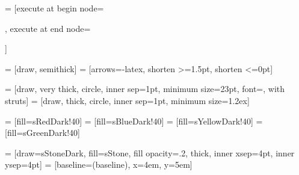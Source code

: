 \usepackage{tikz}
\usetikzlibrary{arrows.meta}
\usetikzlibrary{backgrounds}
\usetikzlibrary{fit}
\usetikzlibrary{scopes}

 = [execute at begin node={\strut}, execute at end node={\strut}]

 = [draw, semithick]
 = [arrows={-latex}, shorten >=1.5pt, shorten <=0pt]

 = [draw, very thick, circle, inner sep=1pt, minimum size=23pt, font=\small, with struts]
 = [draw, thick, circle, inner sep=1pt, minimum size=1.2ex]

 = [fill=sRedDark!40]
 = [fill=sBlueDark!40]
 = [fill=sYellowDark!40]
 = [fill=sGreenDark!40]

 = [draw=sStoneDark, fill=sStone, fill opacity=.2, thick, inner xsep=4pt, inner ysep=4pt]
 = [baseline=(baseline), x=4em, y=5em]
